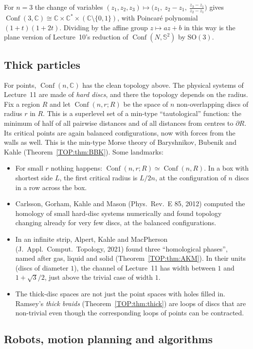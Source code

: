 \documentclass[11pt,openany]{book}
\theoremstyle{plain}
\theoremstyle{definition}
\theoremstyle{remark}
\newcommand{\C}{\mathbb{C}}
\newcommand{\Sph}{\mathbb{S}}          %
\newcommand{\SO}{\mathrm{SO}}
\newcommand{\Conf}{\operatorname{Conf}}
\begin{document}
For $n=3$ the change of variables $(z_1,z_2,z_3)\mapsto\big(z_1,\ z_2-z_1,\ \frac{z_3-z_1}{z_2-z_1}\big)$
gives $\Conf(3,\C)\cong\C\times\C^*\times(\C\setminus\{0,1\})$, with Poincar\'e polynomial $(1+t)(1+2t)$.
Dividing by the affine group $z\mapsto az+b$ in this way is the plane version of Lecture~10's
reduction of $\Conf(N,\Sph^2)$ by $\SO(3)$.

\subsection{Thick particles}

For points, $\Conf(n,\C)$ has the clean topology above. The physical systems of Lecture~11 are made of
\emph{hard discs}, and there the topology depends on the radius. Fix a region $R$ and let
$\Conf(n,r;R)$ be the space of $n$ non-overlapping discs of radius $r$ in $R$. This is a superlevel
set of a min-type ``tautological'' function: the minimum of half of all pairwise distances and of all
distances from centres to $\partial R$. Its critical points are again balanced configurations, now with
forces from the walls as well. This is the min-type Morse theory of Baryshnikov, Bubenik and Kahle
(Theorem~\ref{TOP:thm:BBK}). Some landmarks:
\begin{itemize}
\item For small $r$ nothing happens: $\Conf(n,r;R)\simeq\Conf(n,R)$. In a box with shortest side $L$, the
  first critical radius is $L/2n$, at the configuration of $n$ discs in a row across the box.
\item Carlsson, Gorham, Kahle and Mason (Phys.\ Rev.\ E 85, 2012) computed the homology of small hard-disc systems
  numerically and found topology changing already for very few discs, at the balanced configurations.
\item In an infinite strip, Alpert, Kahle and MacPherson (J.\ Appl.\ Comput.\ Topology,
  2021) found three ``homological phases'', named after gas, liquid and solid
  (Theorem~\ref{TOP:thm:AKM}). In their units (discs of diameter $1$), the channel of Lecture~11 has width
between $1$ and $1+\sqrt3/2$, just above the trivial case of width $1$.
\item The thick-disc spaces are not just the point spaces with holes filled in.
  Ramsey's \emph{thick braids} (Theorem~\ref{TOP:thm:thick}) are loops of discs that are non-trivial even
  though the corresponding loops of points can be contracted.
\end{itemize}

\subsection{Robots, motion planning and algorithms}
\end{document}
